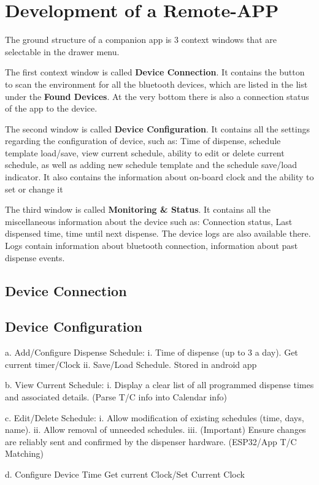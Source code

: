 \section{Development of a Remote-APP}
The ground structure of a companion app is 3 context windows that are selectable in the drawer menu. 

The first context window is called \textbf{Device Connection}. It contains the button to scan the environment for all the bluetooth devices, which are listed in the list under the \textbf{Found Devices}. At the very bottom there is also a connection status of the app to the device.

The second window is called \textbf{Device Configuration}. It contains all the settings regarding the configuration of device, such as: Time of dispense, schedule template load/save, view current schedule, ability to edit or delete current schedule, as well as adding new schedule template and the schedule save/load indicator. It also contains the information about on-board clock and the ability to set or change it


The third window is called \textbf{Monitoring \& Status}. It contains all the miscellaneous information about the device such as: Connection status, Last dispensed time, time until next dispense. The device logs are also available there. Logs contain information about bluetooth connection, information about past dispense events.

\subsection{Device Connection}
\subsection{Device Configuration}
  a. Add/Configure Dispense Schedule:
  i. Time of dispense (up to 3 a day). Get current timer/Clock
  ii. Save/Load Schedule. Stored in android app
  
  b. View Current Schedule:
  i. Display a clear list of all programmed dispense times and associated details. (Parse T/C info into Calendar info)
  
  c. Edit/Delete Schedule:
  i. Allow modification of existing schedules (time, days, name).
  ii. Allow removal of unneeded schedules.
  iii. (Important) Ensure changes are reliably sent and confirmed by the dispenser hardware. (ESP32/App T/C Matching)
  
  d. Configure Device Time Get current Clock/Set Current Clock
  
